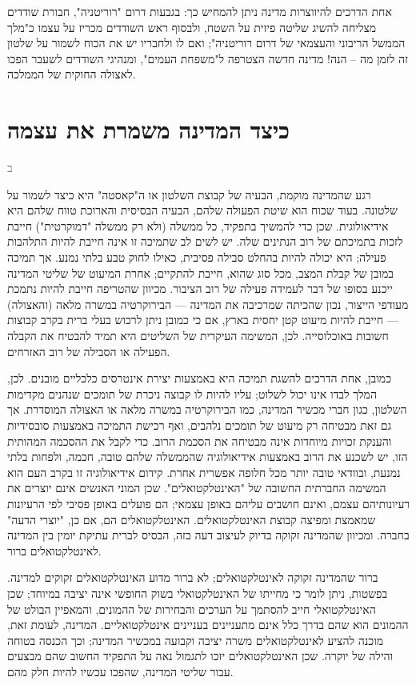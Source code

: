 \documentclass[12pt,oneside]{book}
\newcommand{\hebrewchapter}[2]{%
  \chapter*{#1}%
  \addcontentsline{toc}{chapter}{#1}%
  \lettrine[lines=4, lhang=0.1, loversize=0.5, findent=0pt]{\textcolor{gray} #2}{}%
}
\begin{document}
אחת הדרכים להיווצרות מדינה ניתן להמחיש כך: בגבעות דרום "רוריטניה", חבורת שודדים מצליחה להשיג שליטה פיזית על השטח, ולבסוף ראש השודדים מכריז על עצמו כ"מלך הממשל הריבוני והעצמאי של דרום רוריטניה"; ואם לו ולחבריו יש את הכוח לשמור על שלטון זה לזמן מה – הנה! מדינה חדשה הצטרפה ל"משפחת העמים", ומנהיגי השודדים לשעבר הפכו לאצולה החוקית של הממלכה.

\hebrewchapter{כיצד המדינה משמרת את עצמה}{ב}
רגע שהמדינה מוקמת, הבעיה של קבוצת השלטון או ה"קאסטה" היא כיצד לשמור על שלטונה. בעוד שכוח הוא שיטת הפעולה שלהם, הבעיה הבסיסית והארוכת טווח שלהם היא אידיאולוגית. שכן כדי להמשיך בתפקיד, כל ממשלה (ולא רק ממשלה "דמוקרטית") חייבת לזכות בתמיכתם של רוב הנתינים שלה. יש לשים לב שתמיכה זו אינה חייבת להיות התלהבות פעילה; היא יכולה להיות בהחלט סבילה פסיבית, כאילו לחוק טבע בלתי נמנע. אך תמיכה במובן של קבלת המצב, מכל סוג שהוא, חייבת להתקיים; אחרת המיעוט של שליטי המדינה ייכנע בסופו של דבר לעמידה פעילה של רוב הציבור. מכיוון שהטריפה חייבת להיות נתמכת מעודפי הייצור, נכון שהכיתה שמרכיבה את המדינה — הבירוקרטיה במשרה מלאה (והאצולה) — חייבת להיות מיעוט קטן יחסית בארץ, אם כי כמובן ניתן לרכוש בעלי ברית בקרב קבוצות חשובות באוכלוסייה. לכן, המשימה העיקרית של השליטים היא תמיד להבטיח את הקבלה הפעילה או הסבילה של רוב האזרחים.

כמובן, אחת הדרכים להשגת תמיכה היא באמצעות יצירת אינטרסים כלכליים מובנים. לכן, המלך לבדו אינו יכול לשלוט; עליו להיות לו קבוצה ניכרת של תומכים שנהנים מקדימות השלטון, כגון חברי מכשיר המדינה, כמו הבירוקרטיה במשרה מלאה או האצולה המוסדרת. אך גם זאת מבטיחה רק מיעוט של תומכים נלהבים, ואף רכישת התמיכה באמצעות סובסידיות והענקת זכויות מיוחדות אינה מבטיחה את הסכמת הרוב. כדי לקבל את ההסכמה המהותית הזו, יש לשכנע את הרוב באמצעות אידיאולוגיה שהממשלה שלהם טובה, חכמה, ולפחות בלתי נמנעת, ובוודאי טובה יותר מכל חלופה אפשרית אחרת. קידום אידיאולוגיה זו בקרב העם הוא המשימה החברתית החשובה של "האינטלקטואלים". שכן המוני האנשים אינם יוצרים את רעיונותיהם עצמם, ואינם חושבים עליהם באופן עצמאי; הם פועלים באופן פסיבי לפי הרעיונות שמאמצת ומפיצה קבוצת האינטלקטואלים. האינטלקטואלים הם, אם כן, "יוצרי הדעה" בחברה. ומכיוון שהמדינה זקוקה בדיוק לעיצוב דעה כזה, הבסיס לברית עתיקת יומין בין המדינה לאינטלקטואלים ברור.

ברור שהמדינה זקוקה לאינטלקטואלים; לא ברור מדוע האינטלקטואלים זקוקים למדינה. בפשטות, ניתן לומר כי מחייתו של האינטלקטואלי בשוק החופשי אינה יציבה במיוחד; שכן האינטלקטואלי חייב להסתמך על הערכים והבחירות של ההמונים, והמאפיין הבולט של ההמונים הוא שהם בדרך כלל אינם מתעניינים בעניינים אינטלקטואליים. המדינה, לעומת זאת, מוכנה להציע לאינטלקטואלים משרה יציבה וקבועה במכשיר המדינה; וכך הכנסה בטוחה והילה של יוקרה. שכן האינטלקטואלים יזכו לתגמול נאה על התפקיד החשוב שהם מבצעים עבור שליטי המדינה, שהפכו עכשיו להיות חלק מהם.
\end{document}
